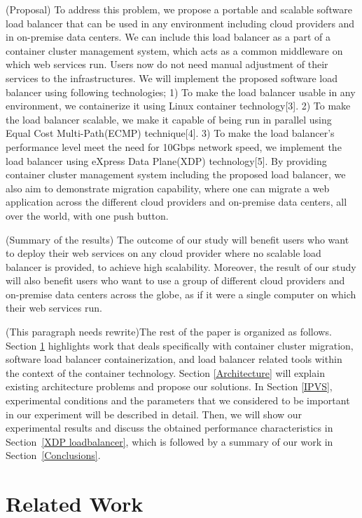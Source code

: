 (Proposal)
To address this problem, we propose a portable and scalable software load balancer that can be used in any environment including cloud providers and in on-premise data centers.
We can include this load balancer as a part of a container cluster management system, which acts as a common middleware on which web services run.
Users now do not need manual adjustment of their services to the infrastructures.
We will implement the proposed software load balancer using following technologies;
1) To make the load balancer usable in any environment, we containerize it using Linux container technology[3].
2) To make the load balancer scalable, we make it capable of being run in parallel using Equal Cost Multi-Path(ECMP) technique[4].
3) To make the load balancer’s performance level meet the need for 10Gbps network speed, we implement the load balancer using eXpress Data Plane(XDP) technology[5].
By providing container cluster management system including the proposed load balancer, we also aim to demonstrate migration capability, where one can migrate a web application across the different cloud providers and on-premise data centers, all over the world, with one push button.

(Summary of the results)
The outcome of our study will benefit users who want to deploy their web services on any cloud provider where no scalable load balancer is provided, to achieve high scalability.
Moreover, the result of our study will also benefit users who want to use a group of different cloud providers and on-premise data centers across the globe, as if it were a single computer on which their web services run.

(This paragraph needs rewrite)The rest of the paper is organized as follows.
Section \ref{Related Work} highlights work that deals specifically with container cluster migration, 
software load balancer containerization, and load balancer related tools within the context of the container technology. 
Section \ref{Architecture} will explain existing architecture problems and propose our solutions.
In Section \ref{IPVS}, experimental conditions and the parameters 
that we considered to be important in our experiment will be described in detail.
Then, we will show our experimental results and discuss the obtained performance characteristics in Section~\ref{XDP loadbalancer},  
which is followed by a summary of our work in Section~\ref{Conclusions}.

\section{Related Work}\label{Related Work}

